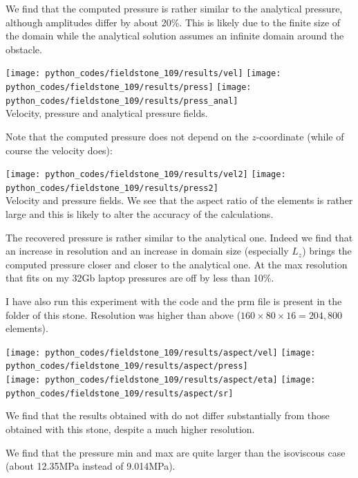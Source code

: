 We find that the computed pressure is rather similar to the analytical pressure, although 
amplitudes differ by about 20\%. This is likely due to the finite size of the domain while 
the analytical solution assumes an infinite domain around the obstacle.

\begin{center}
\texttt{[image: python\_codes/fieldstone\_109/results/vel]}
\texttt{[image: python\_codes/fieldstone\_109/results/press]}
\texttt{[image: python\_codes/fieldstone\_109/results/press\_anal]}\\
{\captionfont Velocity, pressure and analytical pressure fields. }
\end{center}

Note that the computed pressure does not depend on the $z$-coordinate (while of course the velocity does): 
\begin{center}
\texttt{[image: python\_codes/fieldstone\_109/results/vel2]}
\texttt{[image: python\_codes/fieldstone\_109/results/press2]}\\
{\captionfont Velocity and pressure fields. We see that the aspect ratio of the elements
is rather large and this is likely to alter the accuracy of the calculations.}
\end{center}

The recovered pressure is rather similar to the analytical one. Indeed we find that an increase in resolution and 
an increase in domain size (especially $L_z$) brings the computed pressure closer and closer to the 
analytical one. At the max resolution that fits on my 32Gb laptop pressures are off by less than 10\%.

I have also run this experiment with the \aspect code and the prm file is present in 
the folder of this stone. Resolution was higher than above ($160 \times 80 \times 16 =204,800$ elements).

\begin{center}
\texttt{[image: python\_codes/fieldstone\_109/results/aspect/vel]}
\texttt{[image: python\_codes/fieldstone\_109/results/aspect/press]}\\
\texttt{[image: python\_codes/fieldstone\_109/results/aspect/eta]}
\texttt{[image: python\_codes/fieldstone\_109/results/aspect/sr]}
\end{center}

We find that the results obtained with \aspect do not differ substantially from those
obtained with this stone, despite a much higher resolution.

We find that the pressure min and max are quite larger than the isoviscous case (about 12.35MPa instead 
of 9.014MPa).  




